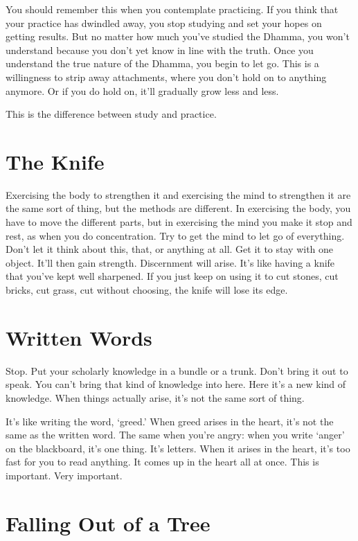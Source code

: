 You should remember this when you contemplate practicing. If you think that your practice has dwindled away, you stop studying and set your hopes on getting results. But no matter how much you've studied the Dhamma, you won't understand because you don't yet know in line with the truth. Once you understand the true nature of the Dhamma, you begin to let go. This is a willingness to strip away attachments, where you don't hold on to anything anymore. Or if you do hold on, it'll gradually grow less and less.

This is the difference between study and practice.

\clearpage

\section{The Knife}

Exercising the body to strengthen it and exercising the mind to strengthen it are the same sort of thing, but the methods are different. In exercising the body, you have to move the different parts, but in exercising the mind you make it stop and rest, as when you do concentration. Try to get the mind to let go of everything. Don't let it think about this, that, or anything at all. Get it to stay with one object. It'll then gain strength. Discernment will arise. It's like having a knife that you've kept well sharpened. If you just keep on using it to cut stones, cut bricks, cut grass, cut without choosing, the knife will lose its edge.

\section{Written Words}

Stop. Put your scholarly knowledge in a bundle or a trunk. Don't bring it out to speak. You can't bring that kind of knowledge into here. Here it's a new kind of knowledge. When things actually arise, it's not the same sort of thing. 

It's like writing the word, `greed.' When greed arises in the heart, it's not the same as the written word. The same when you're angry: when you write `anger' on the blackboard, it's one thing. It's letters. When it arises in the heart, it's too fast for you to read anything. It comes up in the heart all at once. This is important. Very important.

\clearpage

\section{Falling Out of a Tree}

